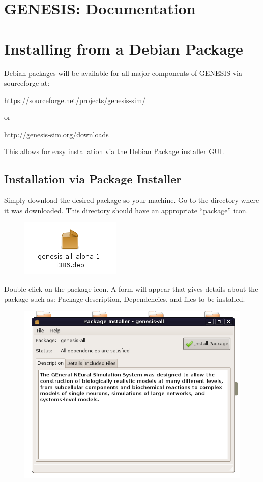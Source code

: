 \documentclass[12pt]{article}
\begin{document}
\section*{GENESIS: Documentation}

\section*{Installing from a Debian Package}

Debian packages will be available for all major components of GENESIS via sourceforge at:

https://sourceforge.net/projects/genesis-sim/

or

http://genesis-sim.org/downloads

This allows for easy installation via the Debian Package installer GUI.

\subsection*{Installation via Package Installer}

Simply download the desired package so your machine. Go to the directory where it was downloaded. This directory should have an appropriate ``package'' icon.

\begin{figure}[h]
   \centering
   \includegraphics[scale=0.6]{figures/install-user-deb-icon.png}
\end{figure}

Double click on the package icon. A form will appear that gives details about the package such as: Package description, Dependencies, and files to be installed.

\begin{figure}[h]
   \centering
   \includegraphics[scale=0.6]{figures/install-user-deb-pkg.png}
\end{figure}
\end{document}
